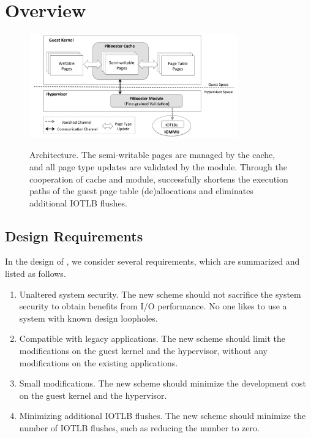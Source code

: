 \section{\name Overview} \label{sec:overview}
\begin{figure}[ht]
\centering
\includegraphics[width=0.8\textwidth]{image/overview/arch.pdf} \\
\caption{\name Architecture. The semi-writable pages are managed by the \name cache, and all page type updates are validated by the \name module.
Through the cooperation of \name cache and \name module, \name successfully shortens the execution paths of the guest page table (de)allocations and eliminates additional IOTLB flushes.}
\label{fig:arch}
\end{figure}

\subsection{Design Requirements}\label{sec:req}
In the design of \name, we consider several requirements, which are summarized and listed as follows.
\begin{enumerate}
\item Unaltered system security. The new scheme should not sacrifice the system security to obtain benefits from I/O performance. No one likes to use a system with known design loopholes.
\item Compatible with legacy applications. The new scheme should limit the modifications on the guest kernel and the hypervisor, without any modifications on the existing applications.
\item Small modifications. The new scheme should minimize the development cost on the guest kernel and the hypervisor.
\item Minimizing additional IOTLB flushes. The new scheme should minimize the number of IOTLB flushes, such as reducing the number to zero.
\end{enumerate}

